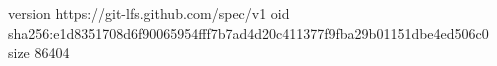 version https://git-lfs.github.com/spec/v1
oid sha256:e1d8351708d6f90065954fff7b7ad4d20c411377f9fba29b01151dbe4ed506c0
size 86404
